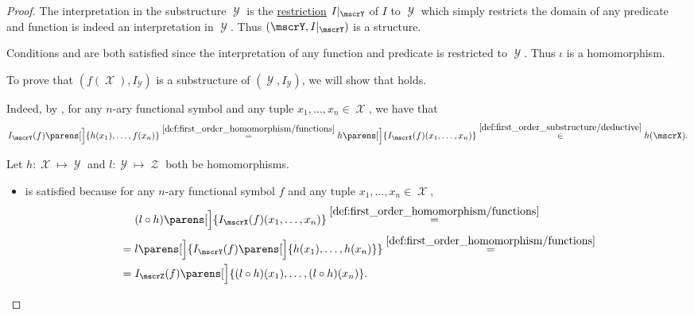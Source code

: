 \begin{proof}
   The interpretation in the substructure \( \mscrY \) is the \hyperref[def:function/extension]{restriction} \( I\restr_\mscrY \) of \( I \) to \( \mscrY \) which simply restricts the domain of any predicate and function is indeed an interpretation in \( \mscrY \). Thus \( (\mscrY, I\restr_\mscrY) \) is a structure.

  Conditions  and  are both satisfied since the interpretation of any function and predicate is restricted to \( \mscrY \). Thus \( \iota \) is a homomorphism.

   To prove that \( (f(\mscrX), I_\mscrY) \) is a substructure of \( (\mscrY, I_\mscrY) \), we will show that  holds.

  Indeed, by , for any \( n \)-ary functional symbol and any tuple \( {x_1, \ldots, x_n \in \mscrX} \), we have that
  \begin{equation*}
    I_\mscrY(f) \parens[\Big]{ h(x_1), \ldots, f(x_n) }
    \overset {\ref{def:first_order_homomorphism/functions}} =
    h\parens[\Big]{ I_\mscrX(f)(x_1, \ldots, x_n) }
    \overset {\ref{def:first_order_substructure/deductive}} \in
    h(\mscrX).
  \end{equation*}

   Let \( h: \mscrX \mapsto \mscrY \) and \( l: \mscrY \mapsto \mscrZ \) both be homomorphisms.

  \begin{itemize}
    \item {} is satisfied because for any \( n \)-ary functional symbol \( f \) and any tuple \( x_1, \ldots, x_n \in \mscrX \),
    \begin{align*}
      &\phantom{{}={}}
      (l \bincirc h) \parens[\Big]{ I_\mscrX(f)(x_1, \ldots, x_n) }
      \overset {\ref{def:first_order_homomorphism/functions}} = \\ &=
      l\parens[\Big]{ I_\mscrY(f) \parens[\Big]{ h(x_1), \ldots, h(x_n) } }
      \overset {\ref{def:first_order_homomorphism/functions}} = \\ &=
      I_{\mscrZ}(f) \parens[\Big]{ (l \bincirc h)(x_1), \ldots, (l \bincirc h)(x_n) }.
    \end{align*}


\end{itemize}
\end{proof}
